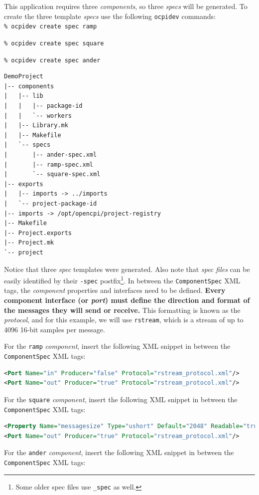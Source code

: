 This application requires three \textit{components}, so three \textit{specs} will be generated. To create the three template \textit{specs} use the following \verb+ocpidev+ commands:\\

\forceindent\verb+% ocpidev create spec ramp+

\forceindent\verb+% ocpidev create spec square+

\forceindent\verb+% ocpidev create spec ander+\\
\OcpidevCreate{}

\bstart
\begin{verbatim}
DemoProject
|-- components
|   |-- lib
|   |   |-- package-id
|   |   `-- workers
|   |-- Library.mk
|   |-- Makefile
|   `-- specs
|       |-- ander-spec.xml
|       |-- ramp-spec.xml
|       `-- square-spec.xml
|-- exports
|   |-- imports -> ../imports
|   `-- project-package-id
|-- imports -> /opt/opencpi/project-registry
|-- Makefile
|-- Project.exports
|-- Project.mk
`-- project
\end{verbatim}
\bend
Notice that three \textit{spec} templates were generated. Also note that \textit{spec files} can be easily identified by their \verb+-spec+ postfix\footnote{Some older spec files use \texttt{\_spec} as well.}. In between the \verb+ComponentSpec+ XML tags, the \textit{component} properties and interfaces need to be defined. \textbf{Every component interface (or \textit{port}) must define the direction and format of the messages they will send or receive.} This formatting is known as the \textit{protocol}, and for this example, we will use \texttt{rstream}, which is a stream of up to 4096 16-bit samples per message.

\bstart
For the \verb+ramp+ \textit{component}, insert the following XML snippet in between the \verb+ComponentSpec+ XML tags:

\begin{lstlisting}[language=xml]
<Port Name="in" Producer="false" Protocol="rstream_protocol.xml"/>
<Port Name="out" Producer="true" Protocol="rstream_protocol.xml"/>
\end{lstlisting}
\bend
\bstart
For the \verb+square+ \textit{component}, insert the following XML snippet in between the \verb+ComponentSpec+ XML tags:

\begin{lstlisting}[language=xml]
<Property Name="messagesize" Type="ushort" Default="2048" Readable="true" Writable="true"/>
<Port Name="out" Producer="true" Protocol="rstream_protocol.xml"/>
\end{lstlisting}
\bend
\bstart
For the \verb+ander+ \textit{component}, insert the following XML snippet in between the \verb+ComponentSpec+ XML tags:

